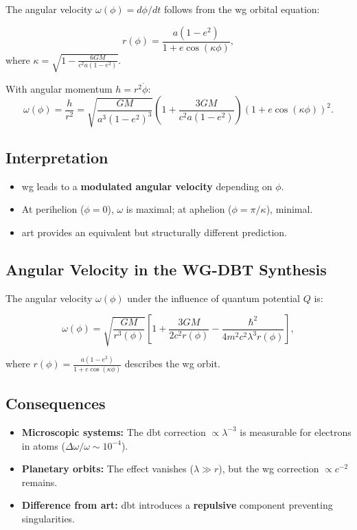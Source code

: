 The angular velocity $\omega(\phi) = d\phi/dt$ follows from the \gls{wg} orbital equation:

\begin{equation}
r(\phi) = \frac{a(1 - e^2)}{1 + e \cos(\kappa \phi)},
\end{equation}
where $\kappa = \sqrt{1 - \frac{6GM}{c^2 a (1 - e^2)}}$. 

With angular momentum $h = r^2 \dot{\phi}$:
\begin{equation}
\omega(\phi) = \frac{h}{r^2} = \sqrt{\frac{GM}{a^3 (1 - e^2)^3}} \left(1 + \frac{3GM}{c^2 a (1 - e^2)}\right) \left(1 + e \cos(\kappa \phi)\right)^2.
\end{equation}

\subsection*{Interpretation}
\begin{itemize}
\item \gls{wg} leads to a \textbf{modulated angular velocity} depending on $\phi$.
\item At perihelion ($\phi = 0$), $\omega$ is maximal; at aphelion ($\phi = \pi/\kappa$), minimal.
\item \gls{art} provides an equivalent but structurally different prediction.
\end{itemize}

\subsection{Angular Velocity in the WG-DBT Synthesis}  
\label{sec:omega_dbt}  

The angular velocity $\omega(\phi)$ under the influence of quantum potential $Q$ is:  

\begin{equation}  
\omega(\phi) = \sqrt{\frac{GM}{r^3(\phi)}} \left[1 + \frac{3GM}{2c^2 r(\phi)} - \frac{\hbar^2}{4m^2 c^2 \lambda^3 r(\phi)}\right],  
\end{equation}  

where $r(\phi) = \frac{a(1-e^2)}{1 + e \cos(\kappa \phi)}$ describes the \gls{wg} orbit.  

\subsection*{Consequences}  
\begin{itemize}  
\item \textbf{Microscopic systems:} The \gls{dbt} correction $\propto \lambda^{-3}$ is measurable for electrons in atoms ($\Delta \omega/\omega \sim 10^{-4}$).  
\item \textbf{Planetary orbits:} The effect vanishes ($\lambda \gg r$), but the \gls{wg} correction $\propto c^{-2}$ remains.  
\item \textbf{Difference from \gls{art}:} \gls{dbt} introduces a \textbf{repulsive} component preventing singularities.  
\end{itemize}

